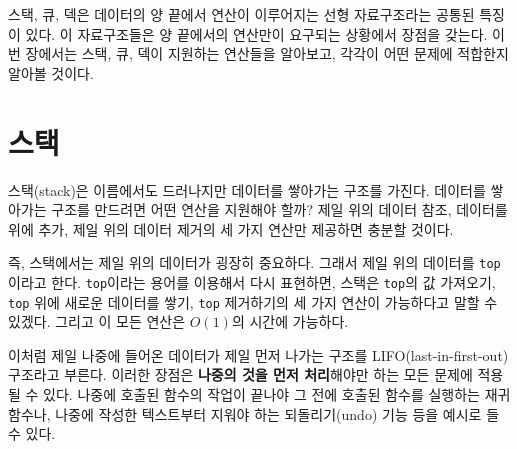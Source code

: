 스택, 큐, 덱은 데이터의 양 끝에서 연산이 이루어지는 선형 자료구조라는 공통된 특징이 있다. 이 자료구조들은 양 끝에서의 연산만이 요구되는 상황에서 장점을 갖는다. 이번 장에서는 스택, 큐, 덱이 지원하는 연산들을 알아보고, 각각이 어떤 문제에 적합한지 알아볼 것이다.

\section{스택}
스택(stack)은 이름에서도 드러나지만 데이터를 쌓아가는 구조를 가진다. 데이터를 쌓아가는 구조를 만드려면 어떤 연산을 지원해야 할까? 제일 위의 데이터 참조, 데이터를 위에 추가, 제일 위의 데이터 제거의 세 가지 연산만 제공하면 충분할 것이다.

\begin{figure}[htbp]
    \centering
\end{figure}

즉, 스택에서는 제일 위의 데이터가 굉장히 중요하다. 그래서 제일 위의 데이터를 \texttt{top}이라고 한다. \texttt{top}이라는 용어를 이용해서 다시 표현하면, 스택은 \texttt{top}의 값 가져오기, \texttt{top} 위에 새로운 데이터를 쌓기, \texttt{top} 제거하기의 세 가지 연산이 가능하다고 말할 수 있겠다. 그리고 이 모든 연산은 $O(1)$의 시간에 가능하다.

이처럼 제일 나중에 들어온 데이터가 제일 먼저 나가는 구조를 LIFO(last-in-first-out) 구조라고 부른다. 이러한 장점은 \textbf{나중의 것을 먼저 처리}해야만 하는 모든 문제에 적용될 수 있다. 나중에 호출된 함수의 작업이 끝나야 그 전에 호출된 함수를 실행하는 재귀함수나, 나중에 작성한 텍스트부터 지워야 하는 되돌리기(undo) 기능 등을 예시로 들 수 있다.

